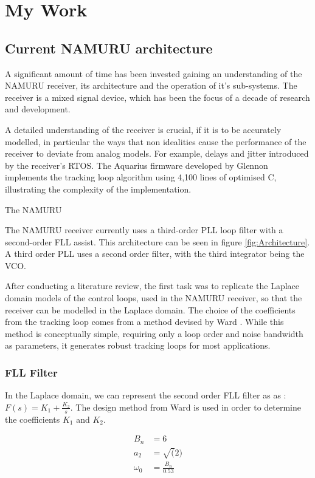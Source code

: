 \chapter{My Work}\label{ch:MyWork}

\section{Current \ac{NAMURU} architecture}
A significant amount of time has been invested gaining an understanding of the \ac{NAMURU} receiver, its architecture and the operation of it's sub-systems. The receiver is a mixed signal device, which has been the focus of a decade of research and development. 

A detailed understanding of the receiver is crucial, if it is to be accurately modelled, in particular the ways that non idealities cause the performance of the receiver to deviate from analog models. For example, delays and jitter introduced  by the receiver's \ac{RTOS}. The Aquarius firmware developed by Glennon \cite{Glennon11aquariusfirmware} implements the tracking loop algorithm using 4,100 lines of optimised C, illustrating the complexity of the implementation.

The \ac{NAMURU}

The \ac{NAMURU} receiver currently uses a third-order \ac{PLL} loop filter with a second-order \ac{FLL} assist. This architecture can be seen in figure \ref{fig:Architecture}.  A third order \ac{PLL} uses a second order filter, with the third integrator being the \ac{VCO}.

After conducting a literature review, the first task was to replicate the Laplace domain models of the control loops, used in the \ac{NAMURU} receiver, so that the receiver can be modelled in the Laplace domain. The choice of the coefficients from the tracking loop comes from a method devised by Ward \cite{Ward}. While this method is conceptually simple, requiring only a loop order and noise bandwidth as parameters, it generates robust tracking loops for most applications. 

\subsection{\ac{FLL} Filter}
In the Laplace domain, we can represent the second order \ac{FLL} filter as as :  $F(s) = K_1 + \frac{K_2}{s}$. The design method from Ward \cite{Ward} is used in order to determine the coefficients $K_1$ and $K_2$.  

\begin{align*}
B_n &= 6\\
a_2 &= \sqrt(2)\\
\omega_{0}&=\frac{B_n}{0.53}\\
\end{align*}

